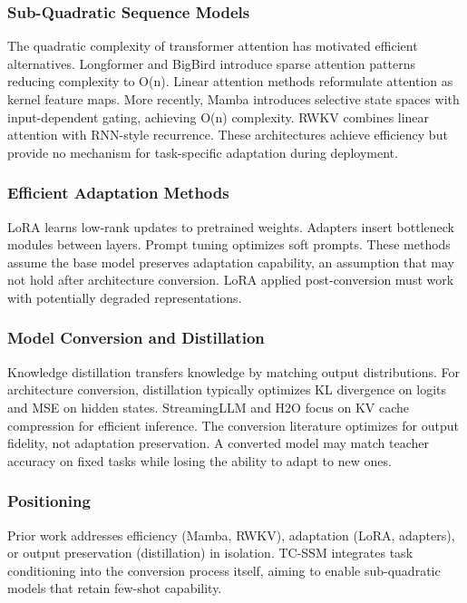 
\subsubsection{Sub-Quadratic Sequence Models}

The quadratic complexity of transformer attention has motivated efficient alternatives. Longformer and BigBird introduce sparse attention patterns reducing complexity to O(n). Linear attention methods reformulate attention as kernel feature maps. More recently, Mamba introduces selective state spaces with input-dependent gating, achieving O(n) complexity. RWKV combines linear attention with RNN-style recurrence. These architectures achieve efficiency but provide no mechanism for task-specific adaptation during deployment.

\subsubsection{Efficient Adaptation Methods}

LoRA learns low-rank updates to pretrained weights. Adapters insert bottleneck modules between layers. Prompt tuning optimizes soft prompts. These methods assume the base model preserves adaptation capability, an assumption that may not hold after architecture conversion. LoRA applied post-conversion must work with potentially degraded representations.

\subsubsection{Model Conversion and Distillation}

Knowledge distillation transfers knowledge by matching output distributions. For architecture conversion, distillation typically optimizes KL divergence on logits and MSE on hidden states. StreamingLLM and H2O focus on KV cache compression for efficient inference. The conversion literature optimizes for output fidelity, not adaptation preservation. A converted model may match teacher accuracy on fixed tasks while losing the ability to adapt to new ones.

\subsubsection{Positioning}

Prior work addresses efficiency (Mamba, RWKV), adaptation (LoRA, adapters), or output preservation (distillation) in isolation. TC-SSM integrates task conditioning into the conversion process itself, aiming to enable sub-quadratic models that retain few-shot capability.

